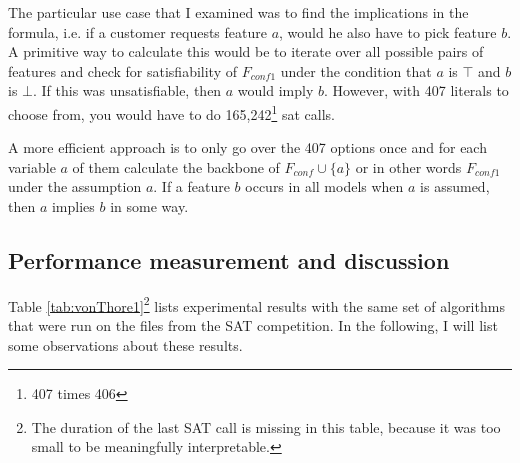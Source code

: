 The particular use case that I examined was to find the implications in the formula, i.e. if a customer requests feature $a$, would he also have to pick feature $b$. A primitive way to calculate this would be to iterate over all possible pairs of features 
and check for satisfiability of $F_{conf1}$ under the condition that $a$ is $\top$ and $b$ is $\bot$. If this was unsatisfiable, then $a$ would imply $b$. However, with 407 literals to choose from, you would have to do 165,242\footnote{407 times 406} sat calls. 

A more efficient approach is to only go over the 407 options once and for each variable $a$ of them calculate the backbone of $F_{conf} \cup \{a\}$ or in other words $F_{conf1}$ under the assumption $a$. If a feature $b$ occurs in all models when $a$ is assumed, then $a$ implies $b$ in some way.


\subsection{Performance measurement and discussion}
Table \ref{tab:vonThore1}\footnote{The duration of the last SAT call is missing in this table, because it was too small to be meaningfully interpretable.} lists experimental results with the same set of algorithms that were run on the files from the SAT competition. In the following, I will list some observations about these results.


